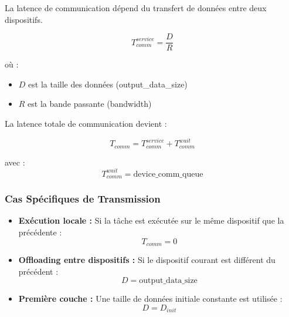 \documentclass[12pt,a4paper]{article}
\begin{document}
La latence de communication dépend du transfert de données entre deux dispositifs.

\begin{equation}
    T_{comm}^{service} = \frac{D}{R}
\end{equation}

où :
\begin{itemize}
    \item $D$ est la taille des données (output\_data\_size)
    \item $R$ est la bande passante (bandwidth)
\end{itemize}

La latence totale de communication devient :

\begin{equation}
    T_{comm} = T_{comm}^{service} + T_{comm}^{wait}
\end{equation}

avec :
\begin{equation}
    T_{comm}^{wait} = \text{device\_comm\_queue}
\end{equation}

 

\subsubsection{Cas Spécifiques de Transmission}

\begin{itemize}
    \item \textbf{Exécution locale :}  
    Si la tâche est exécutée sur le même dispositif que la précédente :
    \begin{equation}
        T_{comm} = 0
    \end{equation}

    \item \textbf{Offloading entre dispositifs :}  
    Si le dispositif courant est différent du précédent :
    \begin{equation}
        D = \text{output\_data\_size}
    \end{equation}

    \item \textbf{Première couche :}  
    Une taille de données initiale constante est utilisée :
    \begin{equation}
        D = D_{init}
    \end{equation}
\end{itemize}

 
\end{document}
